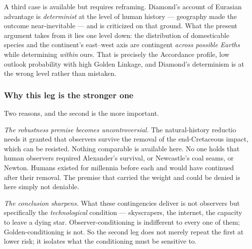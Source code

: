 \documentclass[11pt]{article}
\numberwithin{equation}{section}
\theoremstyle{plain}
\theoremstyle{definition}
\theoremstyle{remark}
\begin{document}
A third case is available but requires reframing. Diamond's account of
Eurasian advantage \cite{Diamond97} is \emph{determinist} at the level
of human history --- geography made the outcome near-inevitable --- and
is criticized on that ground. What the present argument takes from it
lies one level down: the distribution of domesticable species and the
continent's east--west axis are contingent \emph{across possible
Earths} while determining \emph{within} ours. That is precisely the
Accordance profile, low outlook probability with high Golden Linkage,
and Diamond's determinism is at the wrong level rather than mistaken.

\subsubsection{Why this leg is the stronger one}
\label{gc:subsub:strongerleg}

Two reasons, and the second is the more important.

\emph{The robustness premise becomes uncontroversial.} The natural-history
reductio needs it granted that observers survive the removal of the
end-Cretaceous impact, which can be resisted. Nothing comparable is
available here. No one holds that human observers required Alexander's
survival, or Newcastle's coal seams, or Newton. Humans existed for
millennia before each and would have continued after their removal. The
premise that carried the weight and could be denied is here simply not
deniable.

\emph{The conclusion sharpens.} What these contingencies deliver is not
observers but specifically the \emph{technological} condition ---
skyscrapers, the internet, the capacity to leave a dying star.
Observer-conditioning is indifferent to every one of them;
Golden-conditioning is not. So the second leg does not merely repeat
the first at lower risk; it isolates what the conditioning must be
sensitive to.
\end{document}
